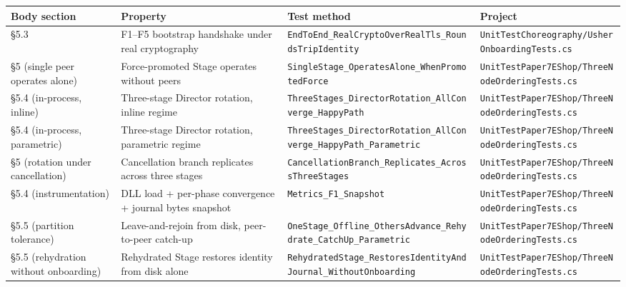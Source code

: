 \documentclass[
]{article}
\newcounter{none} %
\begin{document}
{\def\LTcaptype{none} %
\begin{longtable}[]{@{}
  >{\raggedright\arraybackslash}p{}
  >{\raggedright\arraybackslash}p{}
  >{\raggedright\arraybackslash}p{}
  >{\raggedright\arraybackslash}p{}@{}}
\toprule\noalign{}
\begin{minipage}[b]{\linewidth}\raggedright
Body section
\end{minipage} & \begin{minipage}[b]{\linewidth}\raggedright
Property
\end{minipage} & \begin{minipage}[b]{\linewidth}\raggedright
Test method
\end{minipage} & \begin{minipage}[b]{\linewidth}\raggedright
Project
\end{minipage} \\
\midrule\noalign{}
\endhead
\bottomrule\noalign{}
\endlastfoot
§5.3 & F1--F5 bootstrap handshake under real cryptography &
\texttt{EndToEnd\_RealCryptoOverRealTls\_RoundsTripIdentity} &
\texttt{UnitTestChoreography/UsherOnboardingTests.cs} \\
§5 (single peer operates alone) & Force-promoted Stage operates without
peers & \texttt{SingleStage\_OperatesAlone\_WhenPromotedForce} &
\texttt{UnitTestPaper7EShop/ThreeNodeOrderingTests.cs} \\
§5.4 (in-process, inline) & Three-stage Director rotation, inline regime
& \texttt{ThreeStages\_DirectorRotation\_AllConverge\_HappyPath} &
\texttt{UnitTestPaper7EShop/ThreeNodeOrderingTests.cs} \\
§5.4 (in-process, parametric) & Three-stage Director rotation,
parametric regime &
\texttt{ThreeStages\_DirectorRotation\_AllConverge\_HappyPath\_Parametric}
& \texttt{UnitTestPaper7EShop/ThreeNodeOrderingTests.cs} \\
§5 (rotation under cancellation) & Cancellation branch replicates across
three stages &
\texttt{CancellationBranch\_Replicates\_AcrossThreeStages} &
\texttt{UnitTestPaper7EShop/ThreeNodeOrderingTests.cs} \\
§5.4 (instrumentation) & DLL load + per-phase convergence + journal
bytes snapshot & \texttt{Metrics\_F1\_Snapshot} &
\texttt{UnitTestPaper7EShop/ThreeNodeOrderingTests.cs} \\
§5.5 (partition tolerance) & Leave-and-rejoin from disk, peer-to-peer
catch-up &
\texttt{OneStage\_Offline\_OthersAdvance\_Rehydrate\_CatchUp\_Parametric}
& \texttt{UnitTestPaper7EShop/ThreeNodeOrderingTests.cs} \\
§5.5 (rehydration without onboarding) & Rehydrated Stage restores
identity from disk alone &
\texttt{RehydratedStage\_RestoresIdentityAndJournal\_WithoutOnboarding}
& \texttt{UnitTestPaper7EShop/ThreeNodeOrderingTests.cs} \\
\end{longtable}
}
\end{document}
